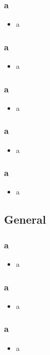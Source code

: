 \documentclass[lualatex,fleqn,12pt,titlepage]{jlreq}
\begin{document}
\subsubsection{a}
\begin{itemize}
    \item a
\end{itemize}
\subsubsection{a}
\begin{itemize}
    \item a
\end{itemize}
\subsubsection{a}
\begin{itemize}
    \item a
\end{itemize}
\subsubsection{a}
\begin{itemize}
    \item a
\end{itemize}
\subsubsection{a}
\begin{itemize}
    \item a
\end{itemize}
\subsection{General}
\subsubsection{a}
\begin{itemize}
    \item a
\end{itemize}
\subsubsection{a}
\begin{itemize}
    \item a
\end{itemize}
\subsubsection{a}
\begin{itemize}
    \item a
\end{itemize}
\end{document}
